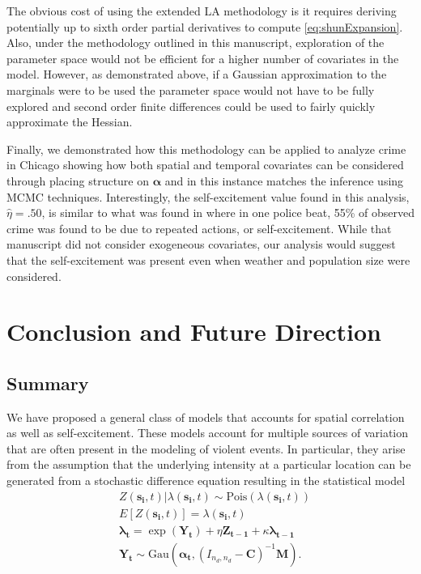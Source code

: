 \documentclass[11pt]{isuthesis}
\begin{document}
	The obvious cost of using the extended LA methodology is it requires deriving potentially up to sixth order partial derivatives to compute \eqref{eq:shunExpansion}.  Also, under the methodology outlined in this manuscript, exploration of the parameter space would not be efficient for a higher number of covariates in the model.  However, as demonstrated above, if a Gaussian approximation to the marginals were to be used the parameter space would not have to be fully explored and second order finite differences could be used to fairly quickly approximate the Hessian.
	
	Finally, we demonstrated how this methodology can be applied to analyze crime in Chicago showing how both spatial and temporal covariates can be considered through placing structure on $\boldsymbol{\alpha}$ and in this instance matches the inference using MCMC techniques.  Interestingly, the self-excitement value found in this analysis, $\hat{\eta}=.50$, is similar to what was found in \cite{mohler2013modeling} where in one police beat, 55\% of observed crime was found to be due to repeated actions, or self-excitement.  While that manuscript did not consider exogeneous covariates, our analysis would suggest that the self-excitement was present even when weather and population size were considered.  
	\chapter{Conclusion and Future Direction}
	
	\section{Summary}
	
	We have proposed a general class of models that accounts for spatial correlation as well as self-excitement.  These models account for multiple sources of variation that are often present in the modeling of violent events.  In particular, they arise from the assumption that the underlying intensity at a particular location can be generated from a stochastic difference equation resulting in the statistical model
	\begin{align}
	& Z(\boldsymbol{s_i},t)|\lambda(\boldsymbol{s_i},t) \sim \mbox{Pois}(\lambda(\boldsymbol{s_i},t)) \label{eq:StochDDS} \\
	& E[Z(\boldsymbol{s_i},t)]=\lambda(\boldsymbol{s_i},t)\nonumber\\
	& \boldsymbol{\lambda_t} = \exp(\boldsymbol{Y_t})+\eta \boldsymbol{Z_{t-1}}+\kappa \boldsymbol{\lambda_{t-1}}\nonumber\\
	& \boldsymbol{Y_t} \sim \mbox{Gau}\textit{} (\boldsymbol{\alpha_t},(I_{{n_d},{n_d}}-\boldsymbol{C})^{-1}\boldsymbol{M})\nonumber.
	\end{align}
\end{document}
